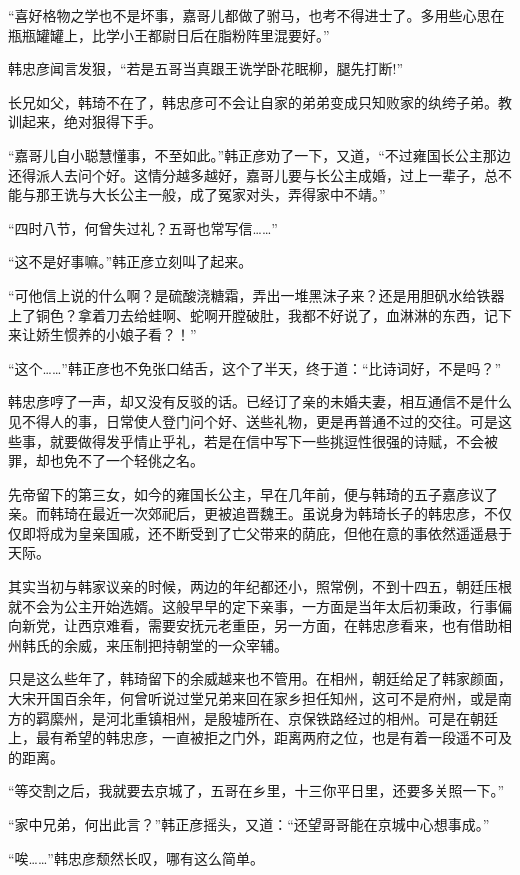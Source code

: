 “喜好格物之学也不是坏事，嘉哥儿都做了驸马，也考不得进士了。多用些心思在瓶瓶罐罐上，比学小王都尉日后在脂粉阵里混要好。”

韩忠彦闻言发狠，“若是五哥当真跟王诜学卧花眠柳，腿先打断!”

长兄如父，韩琦不在了，韩忠彦可不会让自家的弟弟变成只知败家的纨绔子弟。教训起来，绝对狠得下手。

“嘉哥儿自小聪慧懂事，不至如此。”韩正彦劝了一下，又道，“不过雍国长公主那边还得派人去问个好。这情分越多越好，嘉哥儿要与长公主成婚，过上一辈子，总不能与那王诜与大长公主一般，成了冤家对头，弄得家中不靖。”

“四时八节，何曾失过礼？五哥也常写信……”

“这不是好事嘛。”韩正彦立刻叫了起来。

“可他信上说的什么啊？是硫酸浇糖霜，弄出一堆黑沫子来？还是用胆矾水给铁器上了铜色？拿着刀去给蛙啊、蛇啊开膛破肚，我都不好说了，血淋淋的东西，记下来让娇生惯养的小娘子看？！”

“这个……”韩正彦也不免张口结舌，这个了半天，终于道：“比诗词好，不是吗？”

韩忠彦哼了一声，却又没有反驳的话。已经订了亲的未婚夫妻，相互通信不是什么见不得人的事，日常使人登门问个好、送些礼物，更是再普通不过的交往。可是这些事，就要做得发乎情止乎礼，若是在信中写下一些挑逗性很强的诗赋，不会被罪，却也免不了一个轻佻之名。

先帝留下的第三女，如今的雍国长公主，早在几年前，便与韩琦的五子嘉彦议了亲。而韩琦在最近一次郊祀后，更被追晋魏王。虽说身为韩琦长子的韩忠彦，不仅仅即将成为皇亲国戚，还不断受到了亡父带来的荫庇，但他在意的事依然遥遥悬于天际。

其实当初与韩家议亲的时候，两边的年纪都还小，照常例，不到十四五，朝廷压根就不会为公主开始选婿。这般早早的定下亲事，一方面是当年太后初秉政，行事偏向新党，让西京难看，需要安抚元老重臣，另一方面，在韩忠彦看来，也有借助相州韩氏的余威，来压制把持朝堂的一众宰辅。

只是这么些年了，韩琦留下的余威越来也不管用。在相州，朝廷给足了韩家颜面，大宋开国百余年，何曾听说过堂兄弟来回在家乡担任知州，这可不是府州，或是南方的羁縻州，是河北重镇相州，是殷墟所在、京保铁路经过的相州。可是在朝廷上，最有希望的韩忠彦，一直被拒之门外，距离两府之位，也是有着一段遥不可及的距离。

“等交割之后，我就要去京城了，五哥在乡里，十三你平日里，还要多关照一下。”

“家中兄弟，何出此言？”韩正彦摇头，又道：“还望哥哥能在京城中心想事成。”

“唉……”韩忠彦颓然长叹，哪有这么简单。


